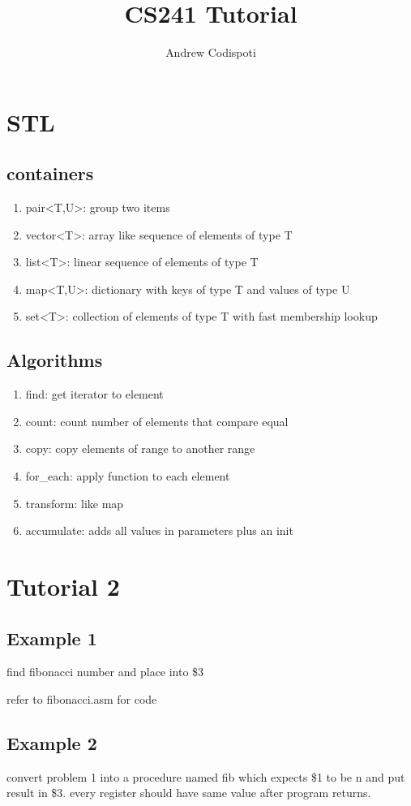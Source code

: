 \documentclass[11pt]{amsart}
\title{CS241 Tutorial}
\author{Andrew Codispoti}
\begin{document}
\maketitle
\section{STL}
\subsection{containers}
\begin{enumerate}
    \item pair<T,U>: group two items
    \item vector<T>: array like sequence of elements of type T
    \item list<T>: linear sequence of elements of type T
    \item map<T,U>: dictionary with keys of type T and values of type U
    \item set<T>: collection of elements of type T with fast membership lookup
\end{enumerate}
\subsection{Algorithms}
\begin{enumerate}
    \item find: get iterator to element
    \item count: count number of elements that compare equal
    \item copy: copy elements of range to another range
    \item for\_each: apply function to each element
    \item transform: like map
    \item accumulate: adds all values in parameters plus an init
\end{enumerate}

\section{Tutorial 2}
\subsection{Example 1}
\par find fibonacci number and place into \$3
\par refer to fibonacci.asm for code
\subsection{Example 2}
\par convert problem 1 into a procedure  named fib  which expects \$1 to be n
and put result in \$3. every register should have same value after program
returns.
\end{document}
